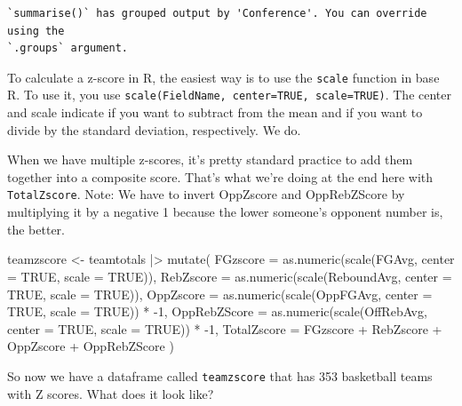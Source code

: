 \documentclass[
  letterpaper,
  DIV=11,
  numbers=noendperiod]{scrreprt}
\newenvironment{Shaded}{\begin{snugshade}}{\end{snugshade}}
\newcommand{\AttributeTok}[1]{\textcolor[rgb]{0.40,0.45,0.13}{#1}}
\newcommand{\ConstantTok}[1]{\textcolor[rgb]{0.56,0.35,0.01}{#1}}
\newcommand{\DecValTok}[1]{\textcolor[rgb]{0.68,0.00,0.00}{#1}}
\newcommand{\FunctionTok}[1]{\textcolor[rgb]{0.28,0.35,0.67}{#1}}
\newcommand{\NormalTok}[1]{\textcolor[rgb]{0.00,0.23,0.31}{#1}}
\newcommand{\OtherTok}[1]{\textcolor[rgb]{0.00,0.23,0.31}{#1}}
\newcommand{\SpecialCharTok}[1]{\textcolor[rgb]{0.37,0.37,0.37}{#1}}
\begin{document}
\begin{verbatim}
`summarise()` has grouped output by 'Conference'. You can override using the
`.groups` argument.
\end{verbatim}

To calculate a z-score in R, the easiest way is to use the
\texttt{scale} function in base R. To use it, you use
\texttt{scale(FieldName,\ center=TRUE,\ scale=TRUE)}. The center and
scale indicate if you want to subtract from the mean and if you want to
divide by the standard deviation, respectively. We do.

When we have multiple z-scores, it's pretty standard practice to add
them together into a composite score. That's what we're doing at the end
here with \texttt{TotalZscore}. Note: We have to invert OppZscore and
OppRebZScore by multiplying it by a negative 1 because the lower
someone's opponent number is, the better.

\begin{Shaded}
\begin{Highlighting}[]
\NormalTok{teamzscore }\OtherTok{\textless{}{-}}\NormalTok{ teamtotals }\SpecialCharTok{|\textgreater{}} 
  \FunctionTok{mutate}\NormalTok{(}
    \AttributeTok{FGzscore =} \FunctionTok{as.numeric}\NormalTok{(}\FunctionTok{scale}\NormalTok{(FGAvg, }\AttributeTok{center =} \ConstantTok{TRUE}\NormalTok{, }\AttributeTok{scale =} \ConstantTok{TRUE}\NormalTok{)),}
    \AttributeTok{RebZscore =} \FunctionTok{as.numeric}\NormalTok{(}\FunctionTok{scale}\NormalTok{(ReboundAvg, }\AttributeTok{center =} \ConstantTok{TRUE}\NormalTok{, }\AttributeTok{scale =} \ConstantTok{TRUE}\NormalTok{)),}
    \AttributeTok{OppZscore =} \FunctionTok{as.numeric}\NormalTok{(}\FunctionTok{scale}\NormalTok{(OppFGAvg, }\AttributeTok{center =} \ConstantTok{TRUE}\NormalTok{, }\AttributeTok{scale =} \ConstantTok{TRUE}\NormalTok{)) }\SpecialCharTok{*} \SpecialCharTok{{-}}\DecValTok{1}\NormalTok{,}
    \AttributeTok{OppRebZScore =} \FunctionTok{as.numeric}\NormalTok{(}\FunctionTok{scale}\NormalTok{(OffRebAvg, }\AttributeTok{center =} \ConstantTok{TRUE}\NormalTok{, }\AttributeTok{scale =} \ConstantTok{TRUE}\NormalTok{)) }\SpecialCharTok{*} \SpecialCharTok{{-}}\DecValTok{1}\NormalTok{,}
    \AttributeTok{TotalZscore =}\NormalTok{ FGzscore }\SpecialCharTok{+}\NormalTok{ RebZscore }\SpecialCharTok{+}\NormalTok{ OppZscore }\SpecialCharTok{+}\NormalTok{ OppRebZScore}
\NormalTok{  )  }
\end{Highlighting}
\end{Shaded}

So now we have a dataframe called \texttt{teamzscore} that has 353
basketball teams with Z scores. What does it look like?
\end{document}
